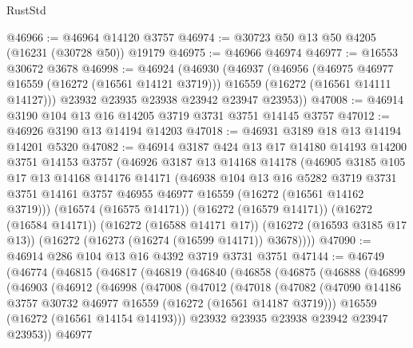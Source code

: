 \begin{lexlean}{RustStd}
\begin{coremodule}
@46966 := @46964 @14120 @3757
@46974 := @30723 @50 @13 @50 @4205 (@16231 (@30728 @50)) @19179
@46975 := @46966 @46974
@46977 := @16553 @30672 @3678
@46998 := @46924
    (@46930
      (@46937
        (@46956
          (@46975 @46977 @16559 (@16272 (@16561 @14121 @3719)))
          @16559
          (@16272 (@16561 @14111 @14127)))
        @23932
        @23935
        @23938
        @23942
        @23947
        @23953))
@47008 := @46914 @3190 @104 @13 @16 @14205 @3719 @3731 @3751 @14145 @3757
@47012 := @46926 @3190 @13 @14194 @14203
@47018 := @46931 @3189 @18 @13 @14194 @14201 @5320
@47082 := @46914
    @3187
    @424
    @13
    @17
    @14180
    @14193
    @14200
    @3751
    @14153
    @3757
    (@46926
      @3187
      @13
      @14168
      @14178
      (@46905
        @3185
        @105
        @17
        @13
        @14168
        @14176
        @14171
        (@46938
          @104
          @13
          @16
          @5282
          @3719
          @3731
          @3751
          @14161
          @3757
          @46955
          @46977
          @16559
          (@16272 (@16561 @14162 @3719)))
        (@16574 (@16575 @14171))
        (@16272 (@16579 @14171))
        (@16272 (@16584 @14171))
        (@16272 (@16588 @14171 @17))
        (@16272 (@16593 @3185 @17 @13))
        (@16272 (@16273 (@16274 (@16599 @14171)) @3678))))
@47090 := @46914 @286 @104 @13 @16 @4392 @3719 @3731 @3751
@47144 := @46749
    (@46774
      (@46815
        (@46817
          (@46819
            (@46840
              (@46858
                (@46875
                  (@46888
                    (@46899
                      (@46903
                        (@46912
                          (@46998
                            (@47008
                              (@47012
                                (@47018
                                  (@47082
                                    (@47090
                                      @14186
                                      @3757
                                      @30732
                                      @46977
                                      @16559
                                      (@16272 (@16561 @14187 @3719)))
                                    @16559
                                    (@16272 (@16561 @14154 @14193)))
                                  @23932
                                  @23935
                                  @23938
                                  @23942
                                  @23947
                                  @23953))
                              @46977

\end{coremodule}
\end{lexlean}
